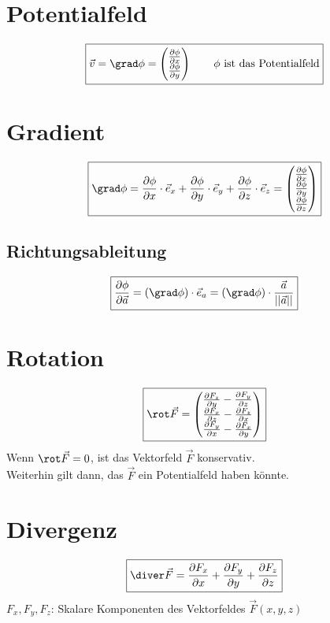 \section{Potentialfeld}
\[ \boxed{\vec{v} = \grad \phi =
\left(\begin{array}{@{}l@{}} 
\frac{\partial \phi}{\partial x} \\
\frac{\partial \phi}{\partial y} \\
\end{array}\right) \qquad \text{$\phi$ ist das Potentialfeld}} \]

\section{Gradient}
\[ \boxed{\grad \phi = \frac{\partial \phi}{\partial x} \cdot \vec{e}_x 
+ \frac{\partial \phi}{\partial y} \cdot \vec{e}_y 
+ \frac{\partial \phi}{\partial z} \cdot \vec{e}_z 
= \left(\begin{array}{@{}l@{}} 
\frac{\partial \phi}{\partial x} \\
\frac{\partial \phi}{\partial y} \\
\frac{\partial \phi}{\partial z} \\
\end{array}\right)} \]

\subsection{Richtungsableitung}
\[ \boxed{\frac{\partial \phi}{\partial \vec{a}} 
= (\grad \phi) \cdot \vec{e}_a 
= (\grad \phi) \cdot \frac{\vec{a}}{||\vec{a}||}} \]

\section{Rotation}
\[ \boxed{\rot \vec{F} = \left( \begin{array}{@{}l@{}} 
\frac{\partial F_z}{\partial y} - \frac{\partial F_y}{\partial z} \\
\frac{\partial F_x}{\partial z} - \frac{\partial F_z}{\partial x} \\
\frac{\partial F_y}{\partial x} - \frac{\partial F_x}{\partial y} \\
\end{array}\right)} \]
Wenn $\rot\vec{F}=0$, ist das Vektorfeld $\vec{F}$ konservativ. \\
Weiterhin gilt dann, das $\vec{F}$ ein Potentialfeld haben könnte.

\section{Divergenz}
\[ \boxed{\diver \vec{F} = \frac{\partial F_x}{\partial x} 
+ \frac{\partial F_y}{\partial y} + \frac{\partial F_z}{\partial z}} \]
$F_x, F_y, F_z$: Skalare Komponenten des Vektorfeldes $\vec{F}(x,y,z)$

